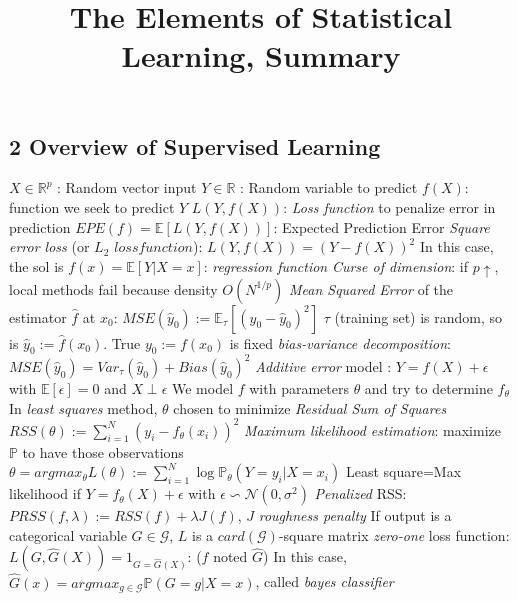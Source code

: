 \documentclass[9pt]{extarticle}
\title{The Elements of Statistical Learning, Summary}
\date{}
\begin{document}
\maketitle
\vspace{-15ex}
\begin{multicols*}{2}

\newcommand\E{\mathbb{E}}
\newcommand\Proba{\mathbb{P}}
\newcommand\R{\mathbb{R}}
\newcommand{\nl}{\newline}
\newcommand{\N}{\mathcal{N}}

\section*{2 Overview of Supervised Learning}

$X \in \mathbb{R}^p$ : Random vector input\nl
$Y \in \mathbb{R}$ : Random variable to predict\nl
$f(X)$: function we seek to predict $Y$\nl
$L(Y,f(X))$: \textit{Loss function} to penalize error in prediction\nl
$EPE(f)=\E[L(Y,f(X))]$: Expected Prediction Error\nl
\emph{Square error loss} (or \emph{$L_2$ $loss function$}): $L(Y,f(X))=(Y-f(X))^2$\nl
In this case, the sol is $f(x)=\E[Y|X=x]$: \emph{regression function}\nl
\emph{Curse of dimension}: if $p\uparrow$, local methods fail because density $O(N^{1/p})$\nl
\emph{Mean Squared Error} of the estimator $\hat{f}$ at $x_0$:
$MSE(\hat{y}_0):=\E_{\tau}[(y_0-\hat{y}_0)^2]$\nl
$\tau$ (training set) is random, so is $\hat{y}_0:=\hat{f}(x_0)$. True $y_0:=f(x_0)$ is fixed\nl
\emph{bias-variance decomposition}: $MSE(\hat{y}_0)=Var_{\tau}(\hat{y}_0)+Bias(\hat{y}_0)^2$\nl
\emph{Additive error} model : $Y=f(X)+\epsilon$ with $\E[\epsilon]=0$ and $X\perp \epsilon$\nl
We model $f$ with parameters $\theta$ and try to determine $f_{\theta}$\nl
In \emph{least squares} method, $\theta$ chosen to minimize \emph{Residual Sum of Squares}\nl
$RSS(\theta):=\sum_{i=1}^{N}(y_i-f_{\theta}(x_i))^2$\nl
\emph{Maximum likelihood estimation}: maximize $\Proba$ to have those observations\nl
$\theta=argmax_{\theta} L(\theta):=\sum_{i=1}^{N}\log \Proba_{\theta}(Y=y_i|X=x_i)$\nl
Least square=Max likelihood if $Y=f_{\theta}(X)+\epsilon$ with $\epsilon \backsim \N(0,\sigma^2)$\nl
\emph{Penalized} RSS: $PRSS(f,\lambda):=RSS(f)+\lambda J(f)$, $J$ \emph{roughness penalty}\nl
If output is a categorical variable $G \in \mathcal{G}$, $L$ is a $card(\mathcal{G})$-square matrix\nl
\textit{zero-one} loss function: $L(G,\hat{G}(X))=1_{G=\hat{G}(X)}$:  ($f$ noted $\hat{G}$)\nl
In this case, $\hat{G}(x)=argmax_{g \in \mathcal{G}} \Proba(G=g|X=x)$, called \textit{bayes classifier}




\end{multicols*}
\end{document}
